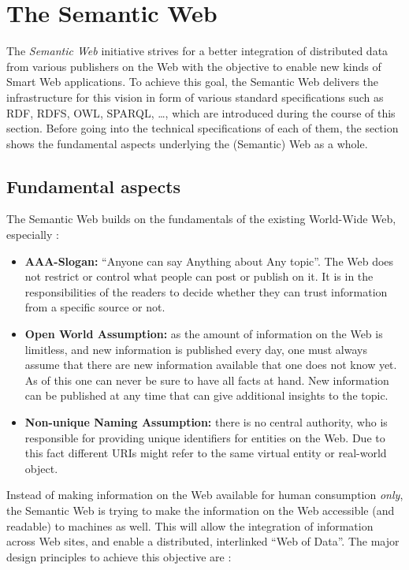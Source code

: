 
\section{The Semantic Web}
\label{sec:semantic_web}

The \emph{Semantic Web} initiative strives for a better integration of distributed data from various publishers on the Web with the objective to enable new kinds of Smart Web applications. To achieve this goal, the Semantic Web delivers the infrastructure for this vision in form of various standard specifications such as \gls{RDF}, \gls{RDFS}, \gls{OWL}, \gls{SPARQL}, \ldots, which are introduced during the course of this section. Before going into the technical specifications of each of them, the section shows the fundamental aspects underlying the (Semantic) Web as a whole.

\subsection{Fundamental aspects}
\label{subsec:fundamentals_semweb}

The Semantic Web builds on the fundamentals of the existing World-Wide Web, especially \citep[pg. 4-11]{allemang2011semantic}: \@

\begin{itemize}
	\item \textbf{AAA-Slogan:} ``Anyone can say Anything about Any topic''. The Web does not restrict or control what people can post or publish on it. It is in the responsibilities of the readers to decide whether they can trust information from a specific source or not.
	\item \textbf{Open World Assumption:} as the amount of information on the Web is limitless, and new information is published every day, one must always assume that there are new information available that one does not know yet. As of this one can never be sure to have all facts at hand. New information can be published at any time that can give additional insights to the topic.
	\item \textbf{Non-unique Naming Assumption:} there is no central authority, who is responsible for providing unique identifiers for entities on the Web. Due to this fact different \gls{URI}s might refer to the same virtual entity or real-world object.
\end{itemize}

Instead of making information on the Web available for human consumption \emph{only}, the Semantic Web is trying to make the information on the Web accessible (and readable) to machines as well. This will allow the integration of information across Web sites, and enable a distributed, interlinked ``Web of Data''. The major design principles to achieve this objective are \citep[pg. 1-22]{antoniou2008semantic}: \@

